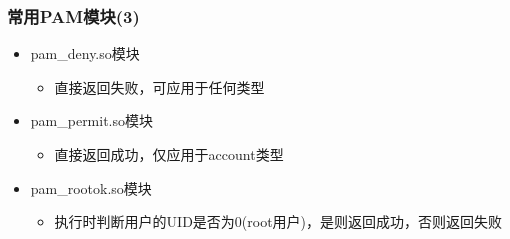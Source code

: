 \documentclass[xcolor=svgnames,presentation]{beamer}
\begin{document}
\begin{frame}
\frametitle{常用PAM模块(3)}
\label{sec-6-12}
\begin{itemize}

\item pam\_deny.so模块
\label{sec-6-12-1}%
\begin{itemize}

\item 直接返回失败，可应用于任何类型
\label{sec-6-12-1-1}%
\end{itemize} %

\item pam\_permit.so模块
\label{sec-6-12-2}%
\begin{itemize}

\item 直接返回成功，仅应用于account类型
\label{sec-6-12-2-1}%
\end{itemize} %

\item pam\_rootok.so模块
\label{sec-6-12-3}%
\begin{itemize}

\item 执行时判断用户的UID是否为0(root用户)，是则返回成功，否则返回失败
\label{sec-6-12-3-1}%
\end{itemize} %
\end{itemize} %
\end{frame}
\end{document}
